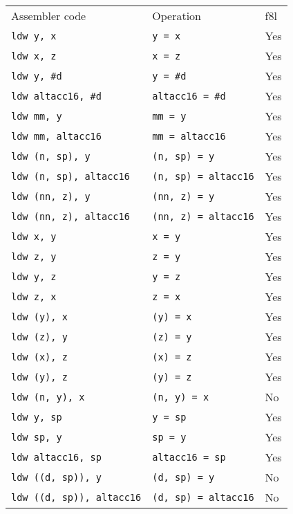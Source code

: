 \documentclass{book}
\begin{document}
\begin{tabular}{l l l}
Assembler code                   & Operation                   & f8l \\
\texttt{ldw y, x}                & \texttt{y = x}              & Yes \\
\texttt{ldw x, z}                & \texttt{x = z}              & Yes \\
\texttt{ldw y, \#d}              & \texttt{y = \#d}            & Yes \\
\texttt{ldw altacc16, \#d}       & \texttt{altacc16 = \#d}     & Yes \\
\texttt{ldw mm, y}               & \texttt{mm = y}             & Yes \\
\texttt{ldw mm, altacc16}        & \texttt{mm = altacc16}      & Yes \\
\texttt{ldw (n, sp), y}          & \texttt{(n, sp) = y}        & Yes \\
\texttt{ldw (n, sp), altacc16}   & \texttt{(n, sp) = altacc16} & Yes \\
\texttt{ldw (nn, z), y}          & \texttt{(nn, z) = y}        & Yes \\
\texttt{ldw (nn, z), altacc16}   & \texttt{(nn, z) = altacc16} & Yes \\
\texttt{ldw x, y}                & \texttt{x = y}              & Yes \\
\texttt{ldw z, y}                & \texttt{z = y}              & Yes \\
\texttt{ldw y, z}                & \texttt{y = z}              & Yes \\
\texttt{ldw z, x}                & \texttt{z = x}              & Yes \\
\texttt{ldw (y), x}              & \texttt{(y) = x}            & Yes \\
\texttt{ldw (z), y}              & \texttt{(z) = y}            & Yes \\
\texttt{ldw (x), z}              & \texttt{(x) = z}            & Yes \\
\texttt{ldw (y), z}              & \texttt{(y) = z}            & Yes \\
\texttt{ldw (n, y), x}           & \texttt{(n, y) = x}         & No \\
\texttt{ldw y, sp}               & \texttt{y = sp}             & Yes \\
\texttt{ldw sp, y}               & \texttt{sp = y}             & Yes \\
\texttt{ldw altacc16, sp}        & \texttt{altacc16 = sp}      & Yes \\
\texttt{ldw ((d, sp)), y}        & \texttt{(d, sp) = y}        & No \\
\texttt{ldw ((d, sp)), altacc16} & \texttt{(d, sp) = altacc16} & No \\
\end{tabular}
\end{document}

